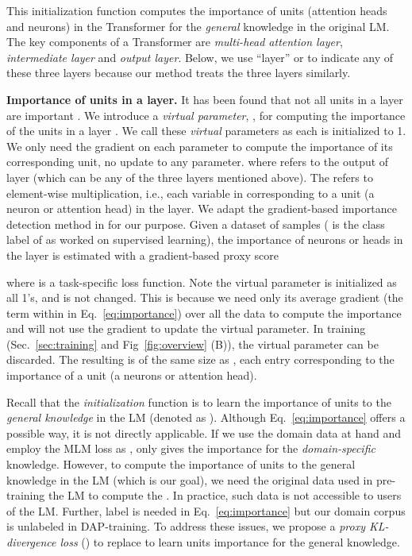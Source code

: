 \documentclass{article} \usepackage{iclr2023_conference,times}
\begin{document}
This initialization function computes the importance of units (attention heads and neurons) in the Transformer for the \textit{general} knowledge in the original LM. The key components of a Transformer are \textit{multi-head attention layer}, \textit{intermediate layer} and \textit{output layer}. {Below, we use ``layer'' or  to indicate any of these three layers because our method treats the three layers similarly.}






\textbf{Importance of units in a layer.} It has been found that not all units in a layer are important \citep{michel2019sixteen}. We introduce a {\color{black}\textit{virtual parameter}}, , for computing the importance of the units in a layer . {\color{black}We call these \textit{virtual} parameters as each  is initialized to 1. We only need the gradient on each parameter to compute the importance of its corresponding unit, no update to any parameter. }
where  refers to the output of layer  (which can be any of the three layers mentioned above). The  refers to element-wise multiplication, i.e., each variable  in  corresponding to a unit (a neuron or attention head) in the layer.  We adapt the gradient-based importance detection method in \citep{michel2019sixteen} for our purpose. Given a dataset  of  samples  ( is the class label of  as \citep{michel2019sixteen} worked on supervised learning), the importance of neurons or heads in the layer is estimated with a gradient-based proxy score

where  is a task-specific loss function. Note the virtual parameter  is initialized as all 1's, and is not changed. This is because we need only its average gradient  (the term within  in Eq.~\ref{eq:importance}) over all the data to compute the importance and will not use the gradient to update the virtual parameter. In training (Sec.~\ref{sec:training} and Fig~\ref{fig:overview} (B)), the virtual parameter can be discarded. {\color{black}The resulting  is of the same size as , each entry corresponding to the importance of a unit (a neurons or attention head).}


Recall that the \textit{initialization} function is to learn the importance of units to the \textit{general knowledge} in the LM ({\color{black}denoted as }). Although Eq.~\ref{eq:importance} offers a possible way, it is not directly applicable. If we use the domain data at hand and employ the MLM loss as ,  only gives the importance for the \textit{domain-specific} knowledge. However, to compute the importance of units to the general knowledge in the LM (which is our goal), we need the original data used in pre-training the LM to compute the . In practice, such data is not accessible to users of the LM. Further, label is needed in Eq.~\ref{eq:importance} but our domain corpus is unlabeled in DAP-training.
To address these issues, we propose a \textit{proxy KL-divergence loss} () to replace  to learn units importance for the general knowledge.
\end{document}
